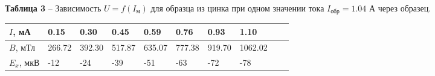 \documentclass[12pt,a4paper]{article}
\begin{document}
    \begin{table}[!h]
        \begin{flushleft}%
       		\textbf{Таблица 3} -- Зависимость $U = f(I_\text{м})$ для образца из цинка при одном значении тока $I_\text{обр} = 1.04$ А через образец.\\
        \end{flushleft}
        \begin{center}
            \begin{tabular}{ | l | l | l | l | l | l | l | l | l | l |}
                \hline
                $I$, мА     &   0.15    & 0.30  & 0.45  & 0.59  & 0.76  & 0.93  & 1.10      \\
                \hline
                $B$, мТл    &   266.72  & 392.30& 517.87& 635.07& 777.38& 919.70& 1062.02   \\
                \hline      
                $E_x$, мкВ  &   -12     &   -24 & -39   & -51   & -63   & -72   & -78       \\
                \hline    
            \end{tabular}
        \end{center}
    \end{table}
\end{document}
